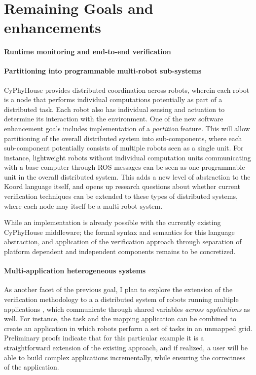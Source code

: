 \section{Remaining Goals and enhancements}
\paragraph{Runtime monitoring and end-to-end verification}

 
\paragraph{Partitioning into programmable multi-robot sub-systems}
CyPhyHouse provides distributed coordination across robots, wherein each robot is a node that performs individual computations potentially as part of a distributed task. Each robot also has individual sensing and actuation to determine its interaction with the environment. One of the new software enhancement goals includes implementation of a \emph{partition} feature. This will allow partitioning of the overall distributed system into sub-components, where each sub-component potentially consists of multiple robots seen as a single unit. For instance, lightweight robots without individual computation units communicating with a base computer through ROS messages can be seen as one programmable unit in the overall distributed system. This adds a new level of abstraction to the Koord language itself, and opens up research questions about whether current verification techniques can be extended to these types of distributed systems, where each node may itself be a multi-robot system.

While an implementation is already possible with the currently existing CyPhyHouse middleware; the formal syntax and semantics for this language abstraction, and application of the verification approach through separation of platform dependent and independent components remains to be concretized. 

\paragraph{Multi-application heterogeneous systems}
As another facet of the previous goal, I plan to explore  the extension of the verification methodology to a a distributed system of robots running multiple applications , which communicate through shared variables \emph{across applications} as well. For instance, the task and the mapping application can be combined to create an application in which robots perform a set of tasks in an unmapped grid. Preliminary proofs indicate that for this particular example it is a straightforward extension of the existing approach, and if realized, a user will be able to build complex applications incrementally, while ensuring the correctness of the application. 



